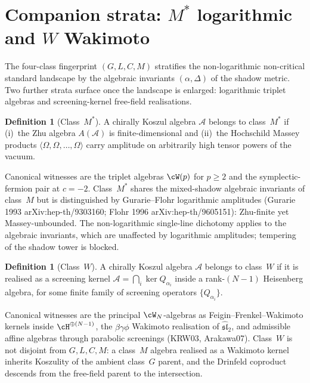 \documentclass[11pt]{article}
\theoremstyle{definition}
\newtheorem{definition}[theorem]{Definition}
\theoremstyle{remark}
\newcommand{\cA}{\mathcal{A}}
\numberwithin{equation}{section}
\begin{document}
\section{Companion strata: $M^\ast$ logarithmic and $W$ Wakimoto}
\label{sec:companion-strata}

The four-class fingerprint $(G,L,C,M)$ stratifies the
non-logarithmic non-critical standard landscape by the algebraic
invariants $(\alpha, \Delta)$ of the shadow metric. Two further
strata surface once the landscape is enlarged: logarithmic
triplet algebras and screening-kernel free-field realisations.

\begin{definition}[Class~$M^\ast$]\label{def:class-M-star-sa}
A chirally Koszul algebra $\cA$ belongs to class~$M^\ast$ if
\textup{(i)}~the Zhu algebra $A(\cA)$ is finite-dimensional and
\textup{(ii)}~the Hochschild Massey products
$\langle \Omega, \Omega, \ldots, \Omega \rangle$ carry
amplitude on arbitrarily high tensor powers of the vacuum.
\end{definition}

Canonical witnesses are the triplet algebras $\cW(p)$ for $p
\geq 2$ and the symplectic-fermion pair at $c = -2$. Class~$M^\ast$
shares the mixed-shadow algebraic invariants of class~$M$ but is
distinguished by Gurarie--Flohr logarithmic amplitudes
(Gurarie 1993 arXiv:hep-th/9303160; Flohr 1996
arXiv:hep-th/9605151): Zhu-finite yet Massey-unbounded. The
non-logarithmic single-line dichotomy applies to the algebraic
invariants, which are unaffected by logarithmic amplitudes;
tempering of the shadow tower is blocked.

\begin{definition}[Class~$W$]\label{def:class-W-sa}
A chirally Koszul algebra $\cA$ belongs to class~$W$ if it is
realised as a screening kernel
$\cA = \bigcap_i \ker Q_{\alpha_i}$
inside a rank-$(N-1)$ Heisenberg algebra, for some
finite family of screening operators $\{Q_{\alpha_i}\}$.
\end{definition}

Canonical witnesses are the principal $\cW_N$-algebras as
Feigin--Frenkel--Wakimoto kernels inside $\cH^{\oplus(N-1)}$,
the $\beta\gamma\phi$ Wakimoto realisation of
$\widehat{\mathfrak{sl}}_2$, and admissible affine algebras
through parabolic screenings (KRW03, Arakawa07). Class~$W$ is
not disjoint from $G,L,C,M$: a class~$M$ algebra realised as a
Wakimoto kernel inherits Koszulity of the ambient class~$G$
parent, and the Drinfeld coproduct descends from the free-field
parent to the intersection.
\end{document}
